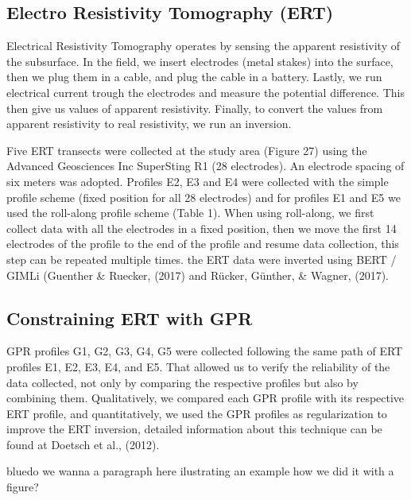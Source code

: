 \documentclass[5p]{elsarticle}
\newcommand{\COMON}{\begin{color}{blue}}
\newcommand{\COMOFF}{\end{color}}
\begin{document}
												
												
										\subsection{Electro Resistivity Tomography (ERT)}

Electrical Resistivity Tomography operates by sensing the apparent resistivity of the subsurface. In the field, we insert electrodes (metal stakes) into the surface, then we plug them in a cable, and plug the cable in a battery. Lastly, we run electrical current trough the electrodes and measure the potential difference. This then give us values of apparent resistivity. Finally, to convert the values from apparent resistivity to real resistivity, we run an inversion.

Five ERT transects were collected at the study area (Figure 27) using the Advanced Geosciences Inc SuperSting R1 (28 electrodes). An electrode spacing of six meters was adopted. Profiles E2, E3 and E4 were collected with the simple profile scheme (fixed position for all 28 electrodes) and for profiles E1 and E5 we used the roll-along profile scheme (Table 1). When using roll-along, we first collect data with all the electrodes in a fixed position, then we move the first 14 electrodes of the profile to the end of the profile and resume data collection, this step can be repeated multiple times.
the ERT data were inverted using BERT / GIMLi (Guenther \& Ruecker, (2017) and Rücker, Günther, \& Wagner, (2017).

										\subsection{Constraining ERT with GPR}
										
GPR profiles G1, G2, G3, G4, G5 were collected following the same path of ERT profiles E1, E2, E3, E4, and E5. That allowed us to verify the reliability of the data collected, not only by comparing the respective profiles but also by combining them. Qualitatively, we compared each GPR profile with its respective ERT profile, and quantitatively, we used the GPR profiles as regularization to improve the ERT inversion, detailed information about this technique can be found at Doetsch et al., (2012).

\COMON do we wanna a paragraph here ilustrating an example how we did it with a figure?\COMOFF
									
									
									
\end{document}
